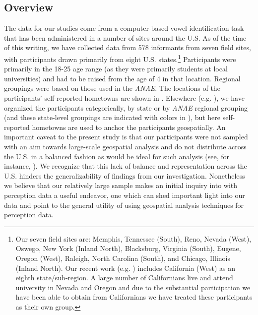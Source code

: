 \documentclass[output=paper]{LSP/langsci}
\begin{document}
\subsection{Overview}
The data for our studies come from a computer-based vowel identification task that has been administered in a number of sites around the U.S. As of the time of this writing, we have collected data from 578 informants from seven field sites, with participants drawn primarily from eight U.S. states.\footnote{Our seven field sites are: Memphis, Tennessee (South), Reno, Nevada (West), Oswego, New York (Inland North), Blacksburg, Virginia (South), Eugene, Oregon (West), Raleigh, North Carolina (South), and Chicago, Illinois (Inland North). Our recent work (e.g. \citealt{kend_frid_inprogress}) includes California (West) as an eighth state/sub-region. A large number of Californians live and attend university in Nevada and Oregon and due to the substantial participation we have been able to obtain from Californians we have treated these participants as their own group.} Participants were primarily in the 18-25 age range (as they were primarily students at local universities) and had to be raised from the age of 4 in that location. Regional groupings were based on those used in the \textit{ANAE}. The locations of the participants’ self-reported hometowns are shown in . Elsewhere (e.g. \citealt{fridland_exploring_2012}), we have organized the participants categorically, by state or by \textit{ANAE} regional grouping (and these state-level groupings are indicated with colors in ), but here self-reported hometowns are used to anchor the participants geospatially. An important caveat to the present study is that our participants were not sampled with an aim towards large-scale geospatial analysis and do not distribute across the U.S. in a balanced fashion as would be ideal for such analysis (see, for instance, \citealt{grieve_corpus-based_2009}). We recognize that this lack of balance and representation across the U.S. hinders the generalizability of findings from our investigation. Nonetheless we believe that our relatively large sample makes an initial inquiry into  with perception data a useful endeavor, one which can shed important light into our data and point to the general utility of using geospatial analysis techniques for perception data.
\end{document}
